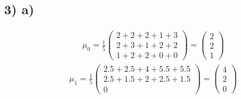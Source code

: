 \subsection*{3) a)}

\begin{align*}
  \mu_0 = \frac{1}{5} \begin{pmatrix} 2 +2 +2 +1 +3 \\ 2 +3 +1 +2 +2 \\ 1 +2 +2 +0 +0 \end{pmatrix} = \begin{pmatrix}2 \\ 2 \\ 1 \end{pmatrix}
\end{align*}
\begin{align*}
  \mu_1 = \frac{1}{5} \begin{pmatrix} 2.5 +2.5 +4 +5.5 +5.5 \\ 2.5 +1.5 +2 +2.5 +1.5 \\ 0 \end{pmatrix} = \begin{pmatrix} 4 \\ 2 \\ 0 \end{pmatrix}
\end{align*}

